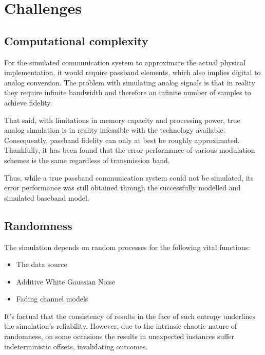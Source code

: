 \section{Challenges}
\subsection{Computational complexity}
For the simulated communication system to approximate the actual physical implementation, it would require passband elements, which also implies digital to analog conversion. The problem with simulating analog signals is that in reality they require infinite bandwidth and therefore an infinite number of samples to achieve fidelity.

That said, with limitations in memory capacity and processing power, true analog simulation is in reality infeasible with the technology available. Consequently, passband fidelity can only at best be roughly approximated. Thankfully, it has been found that the error performance of various modulation schemes is the same regardless of transmission band.

Thus, while a true passband communication system could not be simulated, its error performance was still obtained through the successfully modelled and simulated baseband model.

\subsection{Randomness}
The simulation depends on random processes for the following vital functions:
\begin{itemize}
	\item The data source
	\item Additive White Gaussian Noise
	\item Fading channel models
\end{itemize}
It's factual that the consistency of results in the face of such entropy underlines the simulation's reliability. However, due to the intrinsic chaotic nature of randomness, on some occasions the results in unexpected instances suffer indeterministic offsets, invalidating outcomes.

